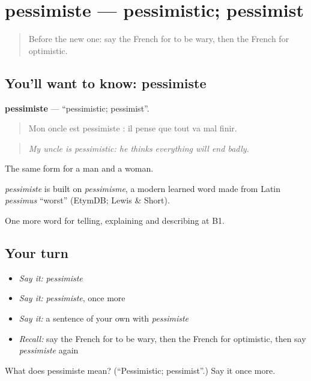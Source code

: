 \section[pessimiste]{pessimiste — pessimistic; pessimist}

\label{lesson:FR-C476-pessimiste}



\begin{quote}
Before the new one: say the French for to be wary, then the French for optimistic.
\end{quote}

\subsection*{You'll want to know: pessimiste}
\textbf{pessimiste} — \textquotedblleft{}pessimistic; pessimist\textquotedblright{}.

\begin{quote}
Mon oncle est pessimiste : il pense que tout va mal finir.
\end{quote}

\begin{quote}
\emph{My uncle is pessimistic: he thinks everything will end badly.}
\end{quote}

The same form for a man and a woman.

\begin{cousinweb}
\emph{pessimiste} is built on \emph{pessimisme}, a modern learned word made from Latin \emph{pessimus} \textquotedblleft{}worst\textquotedblright{} (EtymDB; Lewis \& Short).
\end{cousinweb}

\begin{grammarlens}[title={What you've built}]
One more word for telling, explaining and describing at B1.
\end{grammarlens}

\subsection*{Your turn}
\begin{itemize}
\raggedright
  \item \emph{Say it:} \emph{pessimiste}
  \item \emph{Say it:} \emph{pessimiste}, once more
  \item \emph{Say it:} a sentence of your own with \emph{pessimiste}
  \item \emph{Recall:} say the French for to be wary, then the French for optimistic, then say \emph{pessimiste} again
\end{itemize}

\begin{tcolorbox}[breakable,colback=teal!4,colframe=teal!35!black,title={Before you move on}]
What does pessimiste mean? (\textquotedblleft{}Pessimistic; pessimist\textquotedblright{}.) Say it once more.
\end{tcolorbox}
